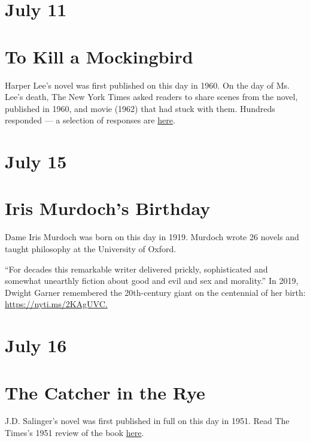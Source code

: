 \hypertarget{july-11-2}{%
\section{July 11}\label{july-11-2}}

\hypertarget{to-kill-a-mockingbird-1}{%
\section{To Kill a Mockingbird}\label{to-kill-a-mockingbird-1}}

Harper Lee's novel was first published on this day in 1960. On the day
of Ms. Lee's death, The New York Times asked readers to share scenes
from the novel, published in 1960, and movie (1962) that had stuck with
them. Hundreds responded --- a selection of responses are
\href{https://nyti.ms/37YK5up?smid=bookscal}{here}.

\hypertarget{july-15}{%
\section{July 15}\label{july-15}}

\hypertarget{iris-murdochs-birthday}{%
\section{Iris Murdoch's Birthday}\label{iris-murdochs-birthday}}

Dame Iris Murdoch was born on this day in 1919. Murdoch wrote 26 novels
and taught philosophy at the University of Oxford.

``For decades this remarkable writer delivered prickly, sophisticated
and somewhat unearthly fiction about good and evil and sex and
morality.'' In 2019, Dwight Garner remembered the 20th-century giant on
the centennial of her birth:
\href{https://nyti.ms/2KAgUVC?smid=bookscal}{https://nyti.ms/2KAgUVC.}

\hypertarget{july-16}{%
\section{July 16}\label{july-16}}

\hypertarget{the-catcher-in-the-rye}{%
\section{The Catcher in the Rye}\label{the-catcher-in-the-rye}}

J.D. Salinger's novel was first published in full on this day in 1951.
Read The Times's 1951 review of the book
\href{https://nyti.ms/31esNIk?smid=bookscal}{here}.


